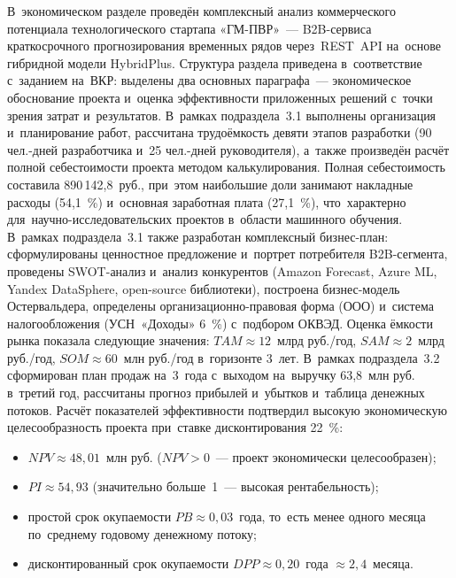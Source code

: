 В~экономическом разделе проведён комплексный анализ коммерческого потенциала
технологического стартапа «ГМ-ПВР»~--- B2B-сервиса краткосрочного
прогнозирования временных рядов через~REST~API на~основе гибридной модели
HybridPlus. Структура раздела приведена в~соответствие с~заданием на~ВКР:
выделены два основных параграфа~--- экономическое обоснование проекта
и~оценка эффективности приложенных решений с~точки зрения затрат и~результатов.
В~рамках подраздела~3.1 выполнены организация и~планирование работ, рассчитана
трудоёмкость девяти этапов разработки (90 чел.-дней разработчика и~25 чел.-дней
руководителя), а~также произведён расчёт полной себестоимости проекта методом
калькулирования. Полная себестоимость составила 890\,142,8~руб., при~этом
наибольшие доли занимают накладные расходы (54,1~\%) и~основная заработная
плата (27,1~\%), что~характерно для~научно-исследовательских проектов в~области
машинного обучения.
В~рамках подраздела~3.1 также разработан комплексный бизнес-план:
сформулированы ценностное предложение и~портрет потребителя B2B-сегмента,
проведены SWOT-анализ и~анализ конкурентов (Amazon Forecast, Azure ML, Yandex
DataSphere, open-source библиотеки), построена бизнес-модель Остервальдера,
определены организационно-правовая форма (ООО) и~система налогообложения
(УСН~«Доходы» 6~\%) с~подбором ОКВЭД. Оценка ёмкости рынка показала следующие
значения: $TAM \approx 12$~млрд руб./год, $SAM \approx 2$~млрд руб./год,
$SOM \approx 60$~млн руб./год в~горизонте 3~лет.
В~рамках подраздела~3.2 сформирован план продаж на~3~года с~выходом на~выручку
63,8~млн руб. в~третий год, рассчитаны прогноз прибылей и~убытков и~таблица
денежных потоков. Расчёт показателей эффективности подтвердил высокую
экономическую целесообразность проекта при~ставке дисконтирования 22~\%:

\begin{itemize}[nosep]
  \item $NPV \approx 48{,}01$~млн руб. ($NPV > 0$~--- проект экономически целесообразен);
  \item $PI \approx 54{,}93$ (значительно больше~1~--- высокая рентабельность);
  \item простой срок окупаемости $PB \approx 0{,}03$~года, то~есть менее одного месяца по~среднему годовому денежному потоку;
  \item дисконтированный срок окупаемости $DPP \approx 0{,}20$~года $\approx 2{,}4$~месяца.
\end{itemize}

